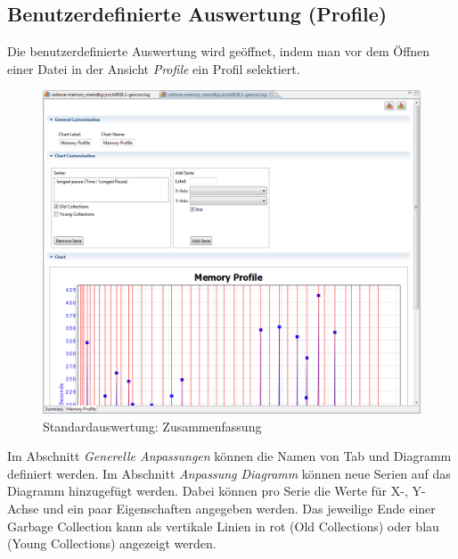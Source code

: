 \subsection{Benutzerdefinierte Auswertung (Profile)}
Die benutzerdefinierte Auswertung wird geöffnet, indem man vor dem Öffnen einer Datei in der Ansicht \textit{Profile} ein Profil selektiert. 
 \begin{figure}[H]
  	\centering
    	\includegraphics[width=15cm]{images/tutorial_custom_report}
        	\caption{Standardauswertung: Zusammenfassung}
\end{figure}
Im Abschnitt \textit{Generelle Anpassungen} können die Namen von Tab  und Diagramm definiert werden. Im Abschnitt \textit{Anpassung Diagramm} können neue Serien auf das Diagramm hinzugefügt werden. Dabei können pro Serie die Werte für X-, Y-Achse und ein paar Eigenschaften angegeben werden. Das jeweilige Ende einer Garbage Collection kann als vertikale Linien in rot (Old Collections) oder blau (Young Collections) angezeigt werden.

